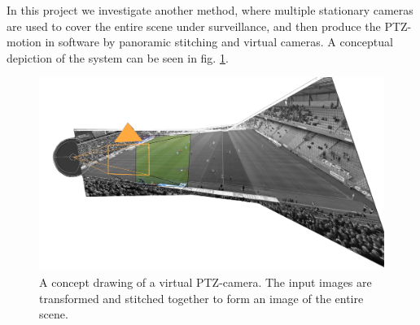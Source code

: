 In this project we investigate another method, where multiple stationary cameras are used to cover the entire scene under surveillance, and then produce the PTZ-motion in software by panoramic stitching and virtual cameras.
A conceptual depiction of the system can be seen in fig. \ref{fig:comp}.

\begin{figure}
	\centering
	\includegraphics[width=0.7\columnwidth]{../results/images/PTZ_comp.png}
	\caption{A concept drawing of a virtual PTZ-camera. The input images are transformed and stitched together to form an image of the entire scene.}
	\label{fig:comp}
\end{figure}
